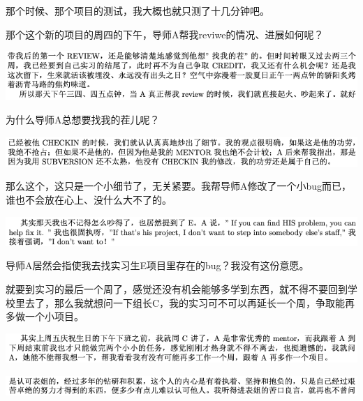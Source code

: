 \documentclass[9pt, b5paper]{article}
\begin{document}
那个时候、那个项目的测试，我大概也就只测了十几分钟吧。

那个这个新的项目的周四的下午，导师A帮我reviwe的情况、进展如何呢？

\begin{center}
\includegraphics[width=.9\linewidth]{./pic/backups_plans_20210514_125439.png}
\end{center}

为什么导师A总想要找我的茬儿呢？

\begin{center}
\includegraphics[width=.9\linewidth]{./pic/backups_plans_20210514_125619.png}
\end{center}

那么这个，这只是一个小细节了，无关紧要。我帮导师A修改了一个小bug而已，谁也不会放在心上、没什么大不了的。 

\begin{center}
\includegraphics[width=.9\linewidth]{./pic/backups_plans_20210514_125725.png}
\end{center}

导师A居然会指使我去找实习生E项目里存在的bug？我没有这份意愿。 

就要到实习的最后一个周了，感觉还没有机会能够多学到东西，就不得不要回到学校里去了，那么我就想问一下组长C，我的实习可不可以再延长一个周，争取能再多做一个小项目。 

\begin{center}
\includegraphics[width=.9\linewidth]{./pic/backups_plans_20210514_115101.png}
\end{center}

\begin{center}
\includegraphics[width=.9\linewidth]{./pic/backups_plans_20210514_115223.png}
\end{center}
\end{document}

